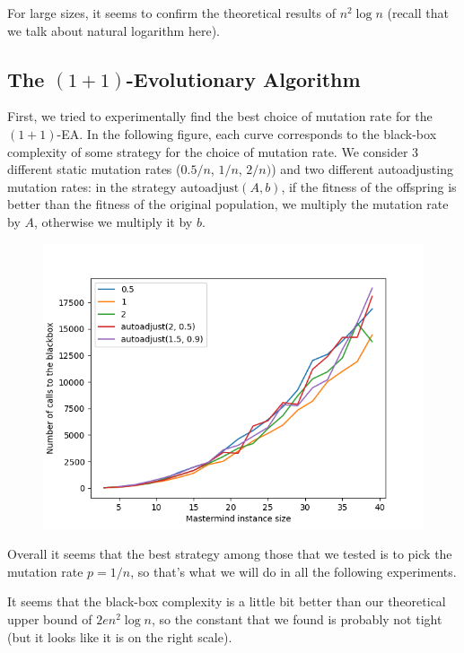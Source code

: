 \documentclass[12pt]{article}
\theoremstyle{definition}
\theoremstyle{plain}
\theoremstyle{remark}
\begin{document}
For large sizes, it seems to confirm the theoretical results of $n^2 \log n$ (recall that
we talk about natural logarithm here).

\subsection{The $(1+1)$-Evolutionary Algorithm}

First, we tried to experimentally find the best choice of mutation rate for the $(1+1)$-EA. In the
following figure, each curve corresponds to the black-box complexity of some strategy for the choice
of mutation rate. We consider 3 different static mutation rates ($0.5/n$, $1/n$, $2/n)$) and two different
autoadjusting mutation rates: in the strategy $\text{autoadjust}(A,b)$, if the fitness of the offspring is
better than the fitness of the original population, we multiply the mutation rate by $A$, otherwise we
multiply it by $b$.

\begin{figure}[h]
    \begin{center}
        \includegraphics[scale=0.7]{rate.png}
    \end{center}
\end{figure}

Overall it seems that the best strategy among those that we tested is to pick the mutation rate $p=1/n$, so
that's what we will do in all the following experiments.


It seems that the black-box complexity is a little bit better than our theoretical upper bound of
$2en^2\log n$, so the constant that we found is probably not tight (but it looks like it is on the right scale).
\end{document}
